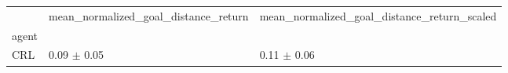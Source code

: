 \begin{tabular}{lll}
\toprule
 & mean_normalized_goal_distance_return & mean_normalized_goal_distance_return_scaled \\
agent &  &  \\
\midrule
CRL & 0.09 $\pm$ 0.05 & 0.11 $\pm$ 0.06 \\
\bottomrule
\end{tabular}
